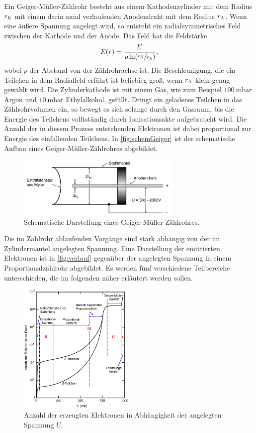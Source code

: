 Ein Geiger-Müller-Zählrohr besteht aus einem Kathodenzylinder mit dem Radius $r_{\text K}$ mit einem darin axial verlaufenden Anodendraht mit dem Radius $r_{\text A}$.
Wenn eine äußere Spannung angelegt wird, so entsteht ein radialsymmetrisches Feld zwischen der Kathode und der Anode.
Das Feld hat die Feldstärke
\begin{align}
    E(r)=\frac{U}{\rho\ln(\sfrac{r_{\text K}}{r_{\text A}})},
\end{align}
wobei $\rho$ der Abstand von der Zählrohrachse ist.
Die Beschleunigung, die ein Teilchen in dem Radialfeld erfährt ist beliebieg groß, wenn $r_{\text A}$ klein genug gewählt wird. \newline
Die Zylinderkathode ist mit einem Gas, wie zum Beispiel $\SI{100}{\milli\bar}$ Argon und $\SI{10}{\milli\bar}$ Ethylalkohol, gefüllt. Dringt ein geladenes Teilchen
in das Zählrohrvolumen ein, so bewegt es sich solange durch den Gasraum, bis die Energie des Teilchens volltständig durch Ionisationsakte aufgebraucht wird. Die Anzahl
der in diesem Prozess entstehenden Elektronen ist dabei proportional zur Energie des einfallenden Teilchens.
In \autoref{fig:schemGeiger} ist der schematische Aufbau eines Geiger-Müller-Zählrohres abgebildet.
\begin{figure}[H]
    \centering
    \includegraphics[width=0.7\textwidth]{data/zaehlrohr.png}
    \caption{Schematische Darstellung eines Geiger-Müller-Zählrohres.}
    \label{fig:schemGeiger}
\end{figure}

Die im Zählrohr ablaufenden Vorgänge sind stark abhängig von der im Zylindermantel angelegten Spannung.
Eine Darstellung der emittierten Elektronen ist in \autoref{fig:verlauf} gegenüber der angelegten Spannung in einem Proportionalzählrohr abgebildet.
Es werden fünf verschiedene Teilbereiche unterschieden, die im folgenden näher erläutert werden sollen.
\begin{figure}[H]
    \centering
    \includegraphics[width=0.5\textwidth]{data/verlauf.png}
    \caption{Anzahl der erzeugten Elektronen in Abhängigkeit der angelegten Spannung $U$.}
    \label{fig:verlauf}
\end{figure}

